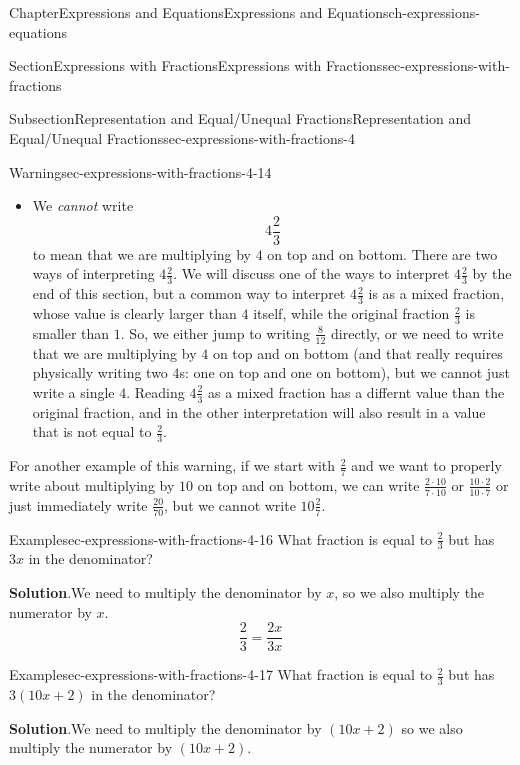 \documentclass[twoside,11pt,]{book}
\newcommand{\blocktitlefont}{\relax}
\numberwithin{equation}{chapter}
\begin{document}
\begin{chapterptx}{Chapter}{Expressions and Equations}{}{Expressions and Equations}{}{}{ch-expressions-equations}
\begin{sectionptx}{Section}{Expressions with Fractions}{}{Expressions with Fractions}{}{}{sec-expressions-with-fractions}
\begin{subsectionptx}{Subsection}{Representation and Equal\slash{}Unequal Fractions}{}{Representation and Equal\slash{}Unequal Fractions}{}{}{sec-expressions-with-fractions-4}
\begin{warning}{Warning}{}{sec-expressions-with-fractions-4-14}
\begin{itemize}[label=\textbullet]
\begin{equation*}
\frac23=\frac{8}{12}
\end{equation*}
%
\item{}We \emph{cannot} write%
\begin{equation*}
4\frac23
\end{equation*}
to mean that we are multiplying by \(4\) on top and on bottom. There are two ways of interpreting \(4\frac23\). We will discuss one of the ways to interpret \(4\frac23\) by the end of this section, but a common way to interpret \(4\frac23\) is as a mixed fraction, whose value is clearly larger than \(4\) itself, while the original fraction \(\frac23\) is smaller than \(1\). So, we either jump to writing \(\frac{8}{12}\) directly, or we need to write that we are multiplying by \(4\) on top and on bottom (and that really requires physically writing two \(4\)s: one on top and one on bottom), but we cannot just write a single \(4\). Reading \(4\frac23\) as a mixed fraction has a differnt value than the original fraction, and in the other interpretation will also result in a value that is not equal to \(\frac23\).%
\end{itemize}
%
\end{warning}
For another example of this warning, if we start with \(\frac{2}{7}\) and we want to properly write about multiplying by \(10\) on top and on bottom, we can write \(\frac{2 \cdot 10}{7 \cdot 10}\) or \(\frac{10 \cdot 2}{10 \cdot 7}\) or just immediately write \(\frac{20}{70}\), but we cannot write \(10\frac27\).%
\begin{example}{Example}{}{sec-expressions-with-fractions-4-16}%
What fraction is equal to \(\frac23\) but has \(3x\) in the denominator?%
\par\smallskip%
\noindent\textbf{\blocktitlefont Solution}.\hypertarget{sec-expressions-with-fractions-4-16-2}{}\quad{}We need to multiply the denominator by \(x\), so we also multiply the numerator by \(x\).%
\begin{equation*}
\frac23 = \frac{2x}{3x}
\end{equation*}
%
\end{example}
\begin{example}{Example}{}{sec-expressions-with-fractions-4-17}%
What fraction is equal to \(\frac23\) but has \(3(10x+2)\) in the denominator?%
\par\smallskip%
\noindent\textbf{\blocktitlefont Solution}.\hypertarget{sec-expressions-with-fractions-4-17-2}{}\quad{}We need to multiply the denominator by \((10x+2)\) so we also multiply the numerator by \((10x+2)\).%

\end{example}
\end{subsectionptx}
\end{sectionptx}
\end{chapterptx}
\end{document}
